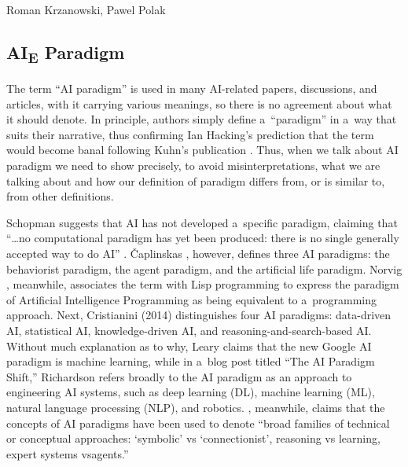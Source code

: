 \begin{artengenv2auth}{Roman Krzanowski, Pawel Polak}
\subsection*{AI\textsubscript{E} Paradigm}

The term ``AI paradigm'' is used in many AI-related papers, discussions, and articles, with it carrying various meanings, so there is no agreement about what it should denote. In principle, authors simply define a~``paradigm'' in a~way that suits their narrative, thus confirming Ian Hacking's prediction that the term would become banal following Kuhn's publication
\parencite[][]{kuhn_introductory_2012}. %
 Thus, when we talk about AI paradigm we need to show precisely, to avoid misinterpretations, what we are talking about and how our definition of paradigm differs from, or is similar to, from other definitions.

Schopman
\parencite*[][]{schopman_artifical_1986} %
 suggests that AI has not developed a~specific paradigm, claiming that ``…no computational paradigm has yet been produced: there is no single generally accepted way to do AI'' 
\parencite[][p.6]{schopman_artifical_1986}. %
 Čaplinskas 
\parencite*[][]{caplinskas_ai_1998}, %
 however, defines three AI paradigms: the behaviorist paradigm, the agent paradigm, and the artificial life paradigm. Norvig 
\parencites*[][]{norvig_paradigms_1992}[][]{norvig_retrospective_2002}, %
 meanwhile, associates the term with Lisp programming to express the paradigm of Artificial Intelligence Programming as being equivalent to a~programming approach. Next, Cristianini (2014) distinguishes four AI paradigms: data-driven AI, statistical AI, knowledge-driven AI, and reasoning-and-search-based AI. Without much explanation as to why, Leary 
\parencite*[][]{leary_googles_2017} %
 claims that the new Google AI paradigm is machine learning, while in a~blog post titled ``The AI Paradigm Shift,'' Richardson 
\parencite*[][]{richardson_ai_2018} %
 refers broadly to the AI paradigm as an approach to engineering AI systems, such as deep learning (DL), machine learning (ML), natural language processing (NLP), and robotics. 
\parencite[][p.2522]{hernandez-orallo_ai_2020}, %
 meanwhile, claims that the concepts of AI paradigms have been used to denote ``broad families of technical or conceptual approaches: ‘symbolic' vs ‘connectionist', reasoning vs learning, expert systems vsagents.''


\end{artengenv2auth}
